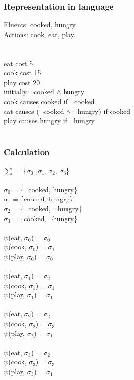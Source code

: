 \documentclass[11pt]{article}
\begin{document}
	\subsubsection{Representation in language}\label{par:p203}
	Fluents: cooked, hungry.\\
	Actions: cook, eat, play.\\
	\\
	\\
	eat cost 5\\
	cook cost 15\\
	play cost 20\\
	initially $\neg$cooked $\land$ hungry\\
	cook causes cooked if $\neg$cooked\\
	eat causes ($\neg$cooked $\land$ $\neg$hungry) if cooked\\
	play causes hungry if $\neg$hungry\\
	\\
	\subsubsection{Calculation}\label{par:p303}
	$\sum$ = \{$\sigma_{0}$ ,$\sigma_{1}$, $\sigma_{2}$, $\sigma_{3}$\}\\
	\\
	$\sigma_{0}$ = \{$\neg$cooked, hungry\}\\
	$\sigma_{1}$ = \{cooked, hungry\}\\
	$\sigma_{2}$ = \{$\neg$cooked, $\neg$hungry\}\\
	$\sigma_{3}$ = \{cooked, $\neg$hungry\}\\
	\\
	$\psi$(eat, $\sigma_{0}$) = $\sigma_{0}$\\
	$\psi$(cook, $\sigma_{0}$) = $\sigma_{1}$\\
	$\psi$(play, $\sigma_{0}$) = $\sigma_{0}$\\
	\\
	$\psi$(eat, $\sigma_{1}$) = $\sigma_{2}$\\
	$\psi$(cook, $\sigma_{1}$) = $\sigma_{1}$\\
	$\psi$(play, $\sigma_{1}$) = $\sigma_{1}$\\
	\\
	$\psi$(eat, $\sigma_{2}$) = $\sigma_{2}$\\
	$\psi$(cook, $\sigma_{2}$) = $\sigma_{3}$\\
	$\psi$(play, $\sigma_{2}$) = $\sigma_{1}$\\
	\\
	$\psi$(eat, $\sigma_{3}$) = $\sigma_{2}$\\
	$\psi$(cook, $\sigma_{3}$) = $\sigma_{3}$\\
	$\psi$(play, $\sigma_{3}$) = $\sigma_{1}$\\
	\\
\end{document}
